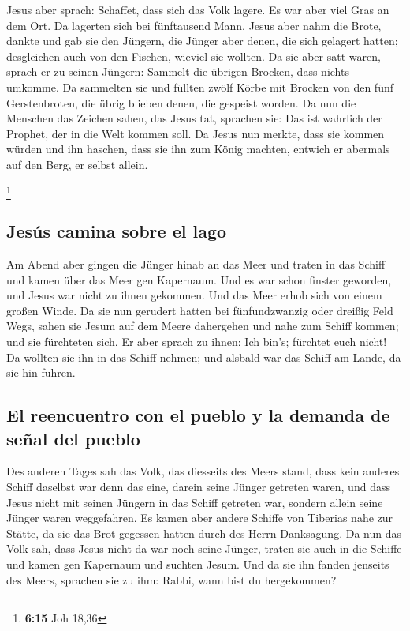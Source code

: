  Jesus aber sprach: Schaffet, dass sich das Volk lagere.
Es war aber viel Gras an dem Ort. Da lagerten sich bei fünftausend Mann.
 Jesus aber nahm die Brote, dankte und gab sie den
Jüngern, die Jünger aber denen, die sich gelagert hatten; desgleichen
auch von den Fischen, wieviel sie wollten.  Da sie aber
satt waren, sprach er zu seinen Jüngern: Sammelt die übrigen Brocken,
dass nichts umkomme.  Da sammelten sie und füllten zwölf
Körbe mit Brocken von den fünf Gerstenbroten, die übrig blieben denen,
die gespeist worden.  Da nun die Menschen das Zeichen
sahen, das Jesus tat, sprachen sie: Das ist wahrlich der Prophet, der in
die Welt kommen soll.  Da Jesus nun merkte, dass sie
kommen würden und ihn haschen, dass sie ihn zum König machten, entwich
er abermals auf den Berg, er selbst allein.

\footnote{\textbf{6:15} Joh 18,36}

\hypertarget{jesuxfas-camina-sobre-el-lago}{%
\subsection{Jesús camina sobre el
lago}\label{jesuxfas-camina-sobre-el-lago}}

 Am Abend aber gingen die Jünger hinab an das Meer
 und traten in das Schiff und kamen über das Meer gen
Kapernaum. Und es war schon finster geworden, und Jesus war nicht zu
ihnen gekommen.  Und das Meer erhob sich von einem großen
Winde.  Da sie nun gerudert hatten bei fünfundzwanzig
oder dreißig Feld Wegs, sahen sie Jesum auf dem Meere dahergehen und
nahe zum Schiff kommen; und sie fürchteten sich.  Er aber
sprach zu ihnen: Ich bin's; fürchtet euch nicht!  Da
wollten sie ihn in das Schiff nehmen; und alsbald war das Schiff am
Lande, da sie hin fuhren.

\hypertarget{el-reencuentro-con-el-pueblo-y-la-demanda-de-seuxf1al-del-pueblo}{%
\subsection{El reencuentro con el pueblo y la demanda de señal del
pueblo}\label{el-reencuentro-con-el-pueblo-y-la-demanda-de-seuxf1al-del-pueblo}}

 Des anderen Tages sah das Volk, das diesseits des Meers
stand, dass kein anderes Schiff daselbst war denn das eine, darein seine
Jünger getreten waren, und dass Jesus nicht mit seinen Jüngern in das
Schiff getreten war, sondern allein seine Jünger waren weggefahren.
 Es kamen aber andere Schiffe von Tiberias nahe zur
Stätte, da sie das Brot gegessen hatten durch des Herrn Danksagung.
 Da nun das Volk sah, dass Jesus nicht da war noch seine
Jünger, traten sie auch in die Schiffe und kamen gen Kapernaum und
suchten Jesum.  Und da sie ihn fanden jenseits des Meers,
sprachen sie zu ihm: Rabbi, wann bist du hergekommen?

